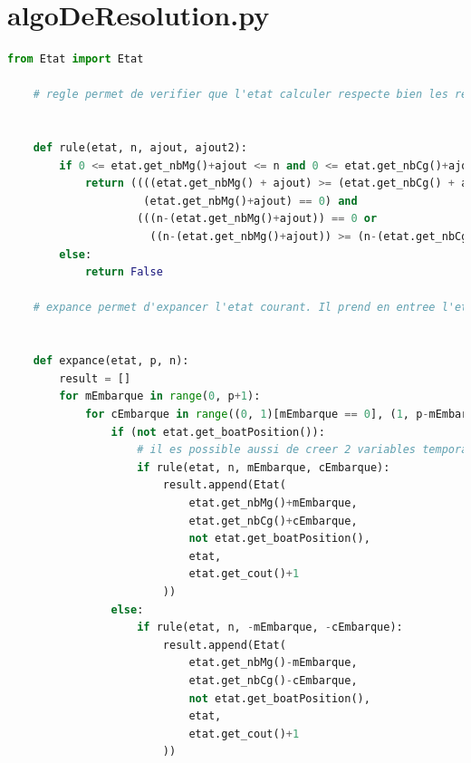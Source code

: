 \documentclass[a4paper, 12pt, french, oneside]{book}
\begin{document}
\section{algoDeResolution.py}

\begin{lstlisting}[language=Python, caption=Python example]
    from Etat import Etat

    # regle permet de verifier que l'etat calculer respecte bien les regles etablis : qu'il n'y ai pas plus de Canibale que de missionnaire sur un cote de la rive (sauf s'il n'y a aucun missionnaire alors il n'y a aucun risque pour eux)
    
    
    def rule(etat, n, ajout, ajout2):
        if 0 <= etat.get_nbMg()+ajout <= n and 0 <= etat.get_nbCg()+ajout2 <= n:
            return ((((etat.get_nbMg() + ajout) >= (etat.get_nbCg() + ajout2)) or
                     (etat.get_nbMg()+ajout) == 0) and
                    (((n-(etat.get_nbMg()+ajout)) == 0 or
                      ((n-(etat.get_nbMg()+ajout)) >= (n-(etat.get_nbCg()+ajout2))))))
        else:
            return False
    
    # expance permet d'expancer l'etat courant. Il prend en entree l'etat courant, la capacite maximale du tableau, et le nombre total de mercerniares et cannibales (ici uniquement n car c 2 valeurs sont egaux ). Il retournera une liste contenant tous les etats trouver par le programme respectant les regles etablis.
    
    
    def expance(etat, p, n):
        result = []
        for mEmbarque in range(0, p+1):
            for cEmbarque in range((0, 1)[mEmbarque == 0], (1, p-mEmbarque+1)[p-mEmbarque+1 > 0]):
                if (not etat.get_boatPosition()):
                    # il es possible aussi de creer 2 variables temporaires et de modifier les informations contenus (+ ou - mais cela revient au meme)
                    if rule(etat, n, mEmbarque, cEmbarque):
                        result.append(Etat(
                            etat.get_nbMg()+mEmbarque,
                            etat.get_nbCg()+cEmbarque,
                            not etat.get_boatPosition(),
                            etat,
                            etat.get_cout()+1
                        ))
                else:
                    if rule(etat, n, -mEmbarque, -cEmbarque):
                        result.append(Etat(
                            etat.get_nbMg()-mEmbarque,
                            etat.get_nbCg()-cEmbarque,
                            not etat.get_boatPosition(),
                            etat,
                            etat.get_cout()+1
                        ))
    

\end{lstlisting}
\end{document}
